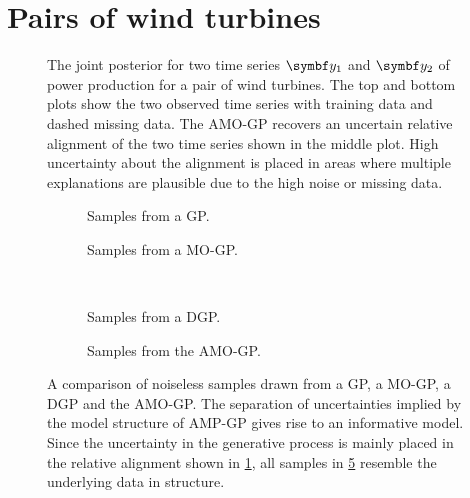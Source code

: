 \section{Pairs of wind turbines}
\label{toc:alignment:wind_example}
\begin{figure}[tp]
    \centering
    \caption{
        \label{fig:alignment:wind_joint_model}
        The joint posterior for two time series $\rv{y_1}$ and $\rv{y_2}$ of power production for a pair of wind turbines.
        The top and bottom plots show the two observed time series with training data and dashed missing data.
        The AMO-GP recovers an uncertain relative alignment of the two time series shown in the middle plot.
        High uncertainty about the alignment is placed in areas where multiple explanations are plausible due to the high noise or missing data.
    }
\end{figure}
\begin{figure}[tp]
    \centering
    \begin{subfigure}[b]{\halffigurewidth}
        \centering
        \caption{
            \label{fig:alignment:wind_samples:a}
            Samples from a GP.
        }
    \end{subfigure}
    \hfill
    \begin{subfigure}[b]{\halffigurewidth}
        \centering
        \caption{
            \label{fig:alignment:wind_samples:b}
            Samples from a MO-GP.
        }
    \end{subfigure}\\[\figureskip]
    \begin{subfigure}[b]{\halffigurewidth}
        \centering
        \caption{
            \label{fig:alignment:wind_samples:c}
            Samples from a DGP.
        }
    \end{subfigure}
    \hfill
    \begin{subfigure}[b]{\halffigurewidth}
        \centering
        \caption{
            \label{fig:alignment:wind_samples:d}
            Samples from the AMO-GP.
        }
    \end{subfigure}
    \caption{
        \label{fig:alignment:wind_samples}
        A comparison of noiseless samples drawn from a GP, a MO-GP, a DGP and the AMO-GP.
        The separation of uncertainties implied by the model structure of AMP-GP gives rise to an informative model.
        Since the uncertainty in the generative process is mainly placed in the relative alignment shown in \cref{fig:alignment:wind_joint_model}, all samples in \cref{fig:alignment:wind_samples:d} resemble the underlying data in structure.
    }
\end{figure}
